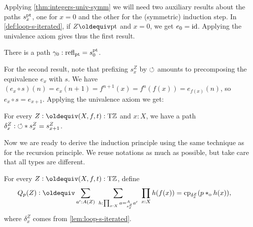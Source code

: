 \documentclass[a4paper,12pt]{amsart}
\begin{document}
Applying \cref{thm:integers-univ-symm} we will need two auxiliary
results about the paths $s^{\mathord{\mathrm{pt}}}_x$, one for $x=0$ and
the other for the (symmetric) induction step.
In \cref{def:loop-s-iterated}, if $Z\jdeq\pt$ and $x=0$, we get $e_0 = \mathord{\mathrm{id}}$.
Applying the univalence axiom gives thus the first result.

\begin{lemma}\label{lem:s-pt-zero}
  There is a path $\gamma_0 : \mathop{{\mathrm{refl}}_{{\mathord{\mathrm{pt}}}}} = s^{\mathord{\mathrm{pt}}}_0$.
\end{lemma}

For the second result, note that prefixing $s^Z_x$ by ${{\circlearrowleft}}$
amounts to precomposing the equivalence $e_x$ with $s$.
We have $(e_x\circ s)(n) = e_x(n+1) = f^{n+1}(x) = f^n(f(x)) =e_{f(x)}(n)$,
so $e_x\circ s = e_{x+1}$. Applying the univalence axiom we get:

\begin{lemma}\label{lem:loop-s-iterated}
  For every $Z\defeq(X,f,t):\TorZ$ and $x:X$, we have a path
  ${\delta^Z_x}: {{\circlearrowleft}} * s^Z_x = s^Z_{x+1}$.
\end{lemma}

Now we are ready to derive the induction principle using the same
technique as for the recursion principle. We reuse notations as much as
possible, but take care that all types are different.

\begin{definition}\label{def:guided-null-hmtps-dep}
For every $Z\defeq(X,f,t):\TorZ$, define
\begin{align*}\label{eq:TBD}
Q_p(Z)&\defeq \sum_{a' : A(Z)}~\sum_{h : \prod_{x:X} a =^A_{s^Z_x} a'}~\prod_{x:X} h(f(x)) = \cp{\delta^Z_x}(p\cto h(x)),
\end{align*}
where $\delta^Z_x$ comes from \cref{lem:loop-s-iterated}.
\end{definition}
\end{document}

